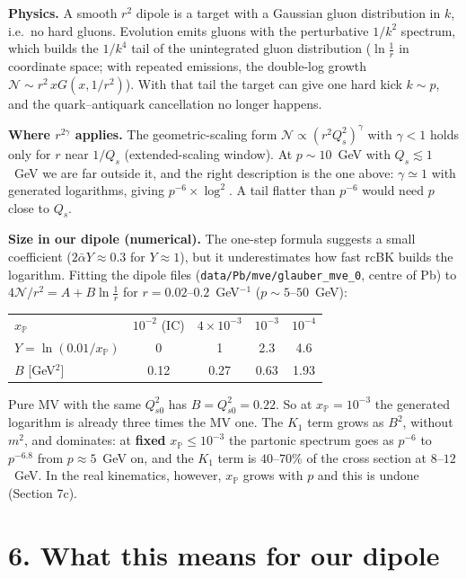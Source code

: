 \documentclass[12pt]{article}
\begin{document}
\textbf{Physics.} A smooth $r^2$ dipole is a target with a Gaussian gluon distribution in $k$, i.e.\ no
hard gluons. Evolution emits gluons with the perturbative $1/k^2$ spectrum, which builds the $1/k^4$ tail
of the unintegrated gluon distribution ($\ln\frac1r$ in coordinate space; with repeated emissions, the
double-log growth $\mathcal N\sim r^2\,xG(x,1/r^2)$). With that tail the target can give one hard kick
$k\sim p$, and the quark--antiquark cancellation no longer happens.

\textbf{Where $r^{2\gamma}$ applies.} The geometric-scaling form $\mathcal N\propto(r^2Q_s^2)^{\gamma}$ with
$\gamma<1$ holds only for $r$ near $1/Q_s$ (extended-scaling window). At $p\sim10$~GeV with
$Q_s\lesssim1$~GeV we are far outside it, and the right description is the one above: $\gamma\simeq1$ with
generated logarithms, giving $p^{-6}\times\log^2$. A tail flatter than $p^{-6}$ would need $p$ close to $Q_s$.

\textbf{Size in our dipole (numerical).} The one-step formula suggests a small coefficient
($2\bar\alpha Y\approx0.3$ for $Y\approx1$), but it underestimates how fast rcBK builds the logarithm.
Fitting the dipole files (\texttt{data/Pb/mve/glauber\_mve\_0}, centre of Pb) to
$4\mathcal N/r^2=A+B\ln\frac1r$ for $r=0.02$--$0.2$~GeV$^{-1}$ ($p\sim5$--$50$~GeV):
\begin{center}
\begin{tabular}{lcccc}
\toprule
$x_{\mathbb P}$ & $10^{-2}$ (IC) & $4\times10^{-3}$ & $10^{-3}$ & $10^{-4}$ \\
$Y=\ln(0.01/x_{\mathbb P})$ & 0 & 1 & 2.3 & 4.6 \\
\midrule
$B$ [GeV$^2$] & 0.12 & 0.27 & 0.63 & 1.93 \\
\bottomrule
\end{tabular}
\end{center}
Pure MV with the same $Q_{s0}^2$ has $B=Q_{s0}^2=0.22$. So at $x_{\mathbb P}=10^{-3}$ the generated logarithm
is already three times the MV one. The $K_1$ term grows as $B^2$, without $m^2$, and dominates: at
\textbf{fixed} $x_{\mathbb P}\le10^{-3}$ the partonic spectrum goes as $p^{-6}$ to $p^{-6.8}$ from
$p\approx5$~GeV on, and the $K_1$ term is $40$--$70\%$ of the cross section at $8$--$12$~GeV.
In the real kinematics, however, $x_{\mathbb P}$ grows with $p$ and this
is undone (Section 7c).

\section*{6. What this means for our dipole}
\end{document}

